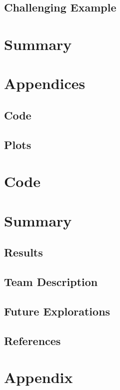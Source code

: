 \documentclass[11pt]{article}
\begin{document}
\subsection{Challenging Example}

\section{Summary}

\section{Appendices}

\subsection{Code}

\subsection{Plots}





\section{Code}



\section{Summary}
\subsection{Results}


\subsection{Team Description}


\subsection{Future Explorations}


\subsection{References}

\section*{Appendix}
\end{document}
